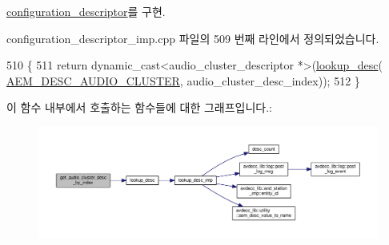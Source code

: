 \hyperlink{classavdecc__lib_1_1configuration__descriptor_a36bc7f659fca61d1057b4250d4a92ca8}{configuration\+\_\+descriptor}를 구현.



configuration\+\_\+descriptor\+\_\+imp.\+cpp 파일의 509 번째 라인에서 정의되었습니다.


\begin{DoxyCode}
510 \{
511     \textcolor{keywordflow}{return} \textcolor{keyword}{dynamic\_cast<}audio\_cluster\_descriptor *\textcolor{keyword}{>}(\hyperlink{classavdecc__lib_1_1configuration__descriptor__imp_a265e068ed32f7c3694417ffe2c382309}{lookup\_desc}(
      \hyperlink{namespaceavdecc__lib_ac7b7d227e46bc72b63ee9e9aae15902fa84158b480b7b6ff17f874ab717903428}{AEM\_DESC\_AUDIO\_CLUSTER}, audio\_cluster\_desc\_index));
512 \}
\end{DoxyCode}


이 함수 내부에서 호출하는 함수들에 대한 그래프입니다.\+:
\nopagebreak
\begin{figure}[H]
\begin{center}
\leavevmode
\includegraphics[width=350pt]{classavdecc__lib_1_1configuration__descriptor__imp_a113e0f8d5a5f11102aa9259843c88878_cgraph}
\end{center}
\end{figure}


